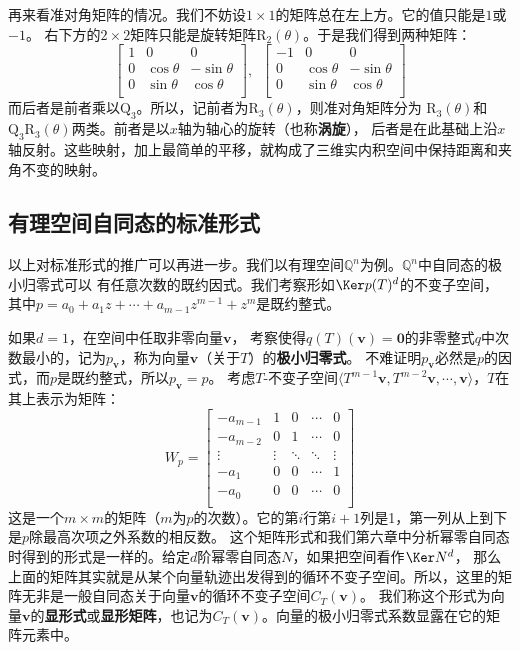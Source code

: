 \documentclass[12pt,UTF8]{ctexbook}
\begin{document}
再来看准对角矩阵的情况。我们不妨设$1\times 1$的矩阵总在左上方。它的值只能是$1$或$-1$。
右下方的$2\times 2$矩阵只能是旋转矩阵$\mathrm{R}_2(\theta)$。于是我们得到两种矩阵：
$$ \begin{bmatrix}
    1 & 0 & 0 \\
    0 & \cos\theta & -\sin\theta \\
    0 & \sin\theta & \cos\theta \\
\end{bmatrix}, \,\,\, \begin{bmatrix}
    -1 & 0 & 0 \\
    0 & \cos\theta & -\sin\theta \\
    0 & \sin\theta & \cos\theta \\
\end{bmatrix}$$
而后者是前者乘以$\mathrm{Q}_3$。所以，记前者为$\mathrm{R}_3(\theta)$，则准对角矩阵分为
$\mathrm{R}_3(\theta)$和$\mathrm{Q}_3\mathrm{R}_3(\theta)$两类。前者是以$x$轴为轴心的旋转（也称\textbf{涡旋}），
后者是在此基础上沿$x$轴反射。这些映射，加上最简单的平移，就构成了三维实内积空间中保持距离和夹角不变的映射。

\subsection{有理空间自同态的标准形式}
以上对标准形式的推广可以再进一步。我们以有理空间$\mathbb{Q}^n$为例。$\mathbb{Q}^n$中自同态的极小归零式可以
有任意次数的既约因式。我们考察形如$\Ker p(T)^{d}$的不变子空间，其中$p = a_0 + a_1z + \cdots + a_{m-1}z^{m-1} + z^m$是既约整式。

如果$d = 1$，在空间中任取非零向量$\mathbf{v}$，
考察使得$q(T)(\mathbf{v}) = \mathbf{0}$的非零整式$q$中次数最小的，记为$p_\mathbf{v}$，称为向量$\mathbf{v}$（关于$T$）的\textbf{极小归零式}。
不难证明$p_\mathbf{v}$必然是$p$的因式，而$p$是既约整式，所以$p_\mathbf{v} = p$。
考虑$T$-不变子空间$\langle T^{m-1}\mathbf{v}, T^{m-2}\mathbf{v}, \cdots , \mathbf{v} \rangle$，$T$在其上表示为矩阵：
$$ W_p = \begin{bmatrix}
    -a_{m-1} & 1 & 0 & \cdots & 0 \\
    -a_{m-2} & 0 & 1 & \cdots & 0 \\
    \vdots & \vdots & \ddots & \ddots & \vdots  \\
    -a_1 & 0 & 0 & \cdots & 1  \\
    -a_0 & 0 & 0 & \cdots & 0 \\
   \end{bmatrix} $$
这是一个$m\times m$的矩阵（$m$为$p$的次数）。它的第$i$行第$i+1$列是1，第一列从上到下是$p$除最高次项之外系数的相反数。
这个矩阵形式和我们第六章中分析幂零自同态时得到的形式是一样的。给定$d$阶幂零自同态$N$，如果把空间看作$\Ker N^d$，
那么上面的矩阵其实就是从某个向量轨迹出发得到的循环不变子空间。所以，这里的矩阵无非是一般自同态关于向量$\mathbf{v}$的循环不变子空间$C_T(\mathbf{v})$。
我们称这个形式为向量$\mathbf{v}$的\textbf{显形式}或\textbf{显形矩阵}，也记为$C_T(\mathbf{v})$。向量的极小归零式系数显露在它的矩阵元素中。
\end{document}
